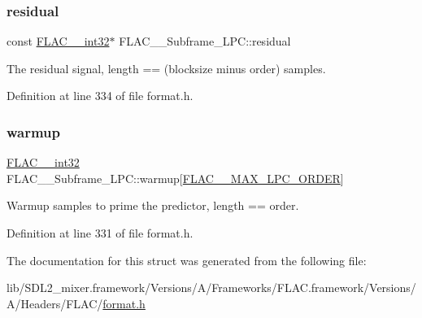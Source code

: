 \subsubsection{\texorpdfstring{residual}{residual}}
{\footnotesize\ttfamily const \mbox{\hyperlink{ordinals_8h_a33fd77bfe6d685541a0c034a75deccdc}{F\+L\+A\+C\+\_\+\+\_\+int32}}$\ast$ F\+L\+A\+C\+\_\+\+\_\+\+Subframe\+\_\+\+L\+P\+C\+::residual}

The residual signal, length == (blocksize minus order) samples. 

Definition at line 334 of file format.\+h.

\mbox{\label{struct_f_l_a_c_____subframe___l_p_c_a91c6c71c6fc2b812da1d2a3761e29807}} 
\subsubsection{\texorpdfstring{warmup}{warmup}}
{\footnotesize\ttfamily \mbox{\hyperlink{ordinals_8h_a33fd77bfe6d685541a0c034a75deccdc}{F\+L\+A\+C\+\_\+\+\_\+int32}} F\+L\+A\+C\+\_\+\+\_\+\+Subframe\+\_\+\+L\+P\+C\+::warmup\mbox{[}\mbox{\hyperlink{group__flac__format_ga16108d413f524329f338cff6e05f3aff}{F\+L\+A\+C\+\_\+\+\_\+\+M\+A\+X\+\_\+\+L\+P\+C\+\_\+\+O\+R\+D\+ER}}\mbox{]}}

Warmup samples to prime the predictor, length == order. 

Definition at line 331 of file format.\+h.



The documentation for this struct was generated from the following file\+:\begin{DoxyCompactItemize}
\item 
lib/\+S\+D\+L2\+\_\+mixer.\+framework/\+Versions/\+A/\+Frameworks/\+F\+L\+A\+C.\+framework/\+Versions/\+A/\+Headers/\+F\+L\+A\+C/\mbox{\hyperlink{format_8h}{format.\+h}}\end{DoxyCompactItemize}
